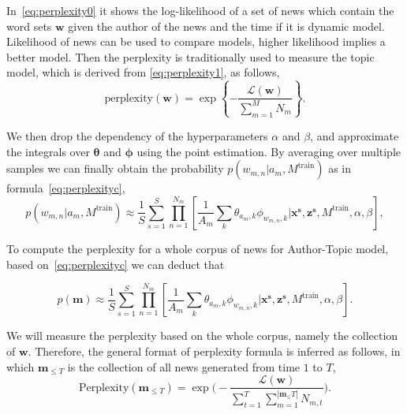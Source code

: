 In~\eqref{eq:perplexity0} it shows the log-likelihood of a set of news which contain the word sets $\boldsymbol{w}$ given the author of the news and the time if it is dynamic model. Likelihood of news can be used to compare models, higher likelihood implies a better model. Then the perplexity is traditionally used to measure the topic model, which is derived from \eqref{eq:perplexity1}, as follows,
 \begin{equation}\label{eq:perplexity1}
 \text{perplexity}(\boldsymbol w) =
        \exp \left\{
        - \frac{\mathcal L(\boldsymbol w)}{\sum_{m=1}^M{N_m}}
        \right\}.
\end{equation}
 
We then drop the dependency of the hyperparameters $\alpha$ and $\beta$, and approximate the integrals over $\boldsymbol{\theta}$ and $\boldsymbol{\phi}$ using the point estimation. By averaging over multiple samples we can finally obtain the probability $p(w_{m,n}|a_m,M^\text{train})$ as in formula~\eqref{eq:perplexityc},
\begin{equation}\label{eq:perplexityc}
p(w_{m,n}|a_m,M^\text{train}) \approx \frac{1}{S} \sum_{s=1}^{S}\prod_{n=1}^{N_m}[\frac{1}{A_m}\sum_{k}\theta_{a_m,k}\phi_{w_{m,n},k}|\boldsymbol{x^s},\boldsymbol{z^s},M^\text{train},\alpha,\beta],
\end{equation}

To compute the perplexity for a whole corpus of news for Author-Topic model, based on~\eqref{eq:perplexityc} we can deduct that 

\begin{equation}\label{eq:perplexity2}
p(\boldsymbol{m}) \approx \frac{1}{S} \sum_{s=1}^{S}\prod_{n=1}^{N_m}[\frac{1}{A_m}\sum_{k}\theta_{a_m,k}\phi_{w_{m,n},k}|\boldsymbol{x^s},\boldsymbol{z^s},M^\text{train},\alpha,\beta].
\end{equation}

We will measure the perplexity based on the whole corpus, namely the collection of $\boldsymbol{w}$. Therefore, the general format of perplexity formula is inferred as follows, in which $\mathbf{m}_{\le T}$ is the collection of all news generated from time $1$ to $T$, 
\begin{equation}
\text{Perplexity}(\mathbf{m}_{\le T})=\exp\big(-\frac{ \mathcal L (\boldsymbol w)}{\sum_{t=1}^{T}\sum_{m=1}^{|\mathbf{m}_\le T|} N_{m,t}}\big).
\end{equation}

